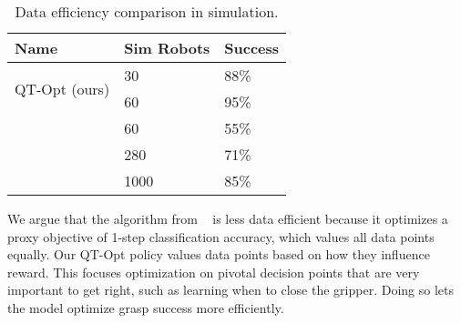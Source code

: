\documentclass{article}
\begin{document}
\begin{table}[h]
\begin{center}
\begin{tabular}{ |p{7em}|p{5em}|p{3em}| } 
\hline
Name & Sim Robots &
Success \\
\hline
\multirow{2}{7em}{QT-Opt (ours)} & 30 & 88\% \\
&60 & 95\% \\
\hline
\multirow{3}{7em}{\citet{levine16}} & 60 & 55\% \\
& 280 & 71\% \\
& 1000 & 85\% \\
 \hline
\end{tabular}
\end{center}
\caption{Data efficiency comparison in simulation.}
\label{table:sim-data-eff}
\vspace{-0.25in}
\end{table}
We argue that the algorithm from ~\citet{levine16} is less data efficient because it optimizes a proxy objective of 1-step classification accuracy, which values all data points equally. Our QT-Opt policy values data points based on how they influence reward. This focuses optimization on pivotal decision points that are very important to get right, such as learning when to close the gripper. Doing so lets the model optimize grasp success more efficiently.
\end{document}
